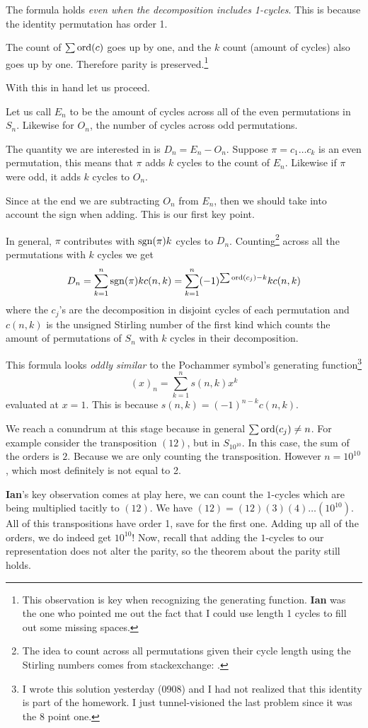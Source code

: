 \documentclass[12pt]{memoir}
\begin{document}
\begin{Rmk}
The formula holds \emph{even when the decomposition includes 1-cycles}. This is because the identity permutation has order 1.\par 
The count of $\sum\operatorname{ord}(c)$ goes up by one, and the $k$ count (amount of cycles) also goes up by one. Therefore parity is preserved.\footnote{This observation is key when recognizing the generating function. \textbf{Ian} was the one who pointed me out the fact that I could use length 1 cycles to fill out some missing spaces.}
\end{Rmk}

With this in hand let us proceed.

\begin{ptcbr}
Let us call $E_n$ to be the amount of cycles across all of the even permutations in $S_n$. Likewise for $O_n$, the number of cycles across odd permutations.\par 
The quantity we are interested in is $D_n=E_n-O_n$. Suppose $\pi=c_1\dots c_k$ is an even permutation, this means that $\pi$ adds $k$ cycles to the count of $E_n$. Likewise if $\pi$ were odd, it adds $k$ cycles to $O_n$.\par 
Since at the end we are subtracting $O_n$ from $E_n$, then we should take into account the sign when adding. This is our first key point.\par 
In general, $\pi$ contributes with $\operatorname{sgn}(\pi)k$ cycles to $D_n$. Counting\footnote{The idea to count across all permutations given their cycle length using the Stirling numbers comes from stackexchange: .} across all the permutations with $k$ cycles we get 
$$D_n=\sum_{k=1}^n\operatorname{sgn}(\pi)kc(n,k)=\sum_{k=1}^n(-1)^{\sum\operatorname{ord}(c_j)-k}kc(n,k)$$
where the $c_j$'s are the decomposition in disjoint cycles of each permutation and $c(n,k)$ is the unsigned Stirling number of the first kind which counts the amount of permutations of $S_n$ with $k$ cycles in their decomposition.\par 
This formula looks \emph{oddly similar} to the Pochammer symbol's generating function\footnote{I wrote this solution yesterday (0908) and I had not realized that this identity is part of the homework. I just tunnel-visioned the last problem since it was the 8 point one.} 
$$(x)_n=\sum_{k=1}^ns(n,k)x^k$$
evaluated at $x=1$. This is because $s(n,k)=(-1)^{n-k}c(n,k)$.
\end{ptcbr}

We reach a conundrum at this stage because in general $\sum\operatorname{ord}(c_j)\neq n$. For example consider the transposition $(12)$, but in $S_{10^{10}}$. In this case, the sum of the orders is $2$. Because we are only counting the transposition. However $n=10^{10}$, which most definitely is not equal to 2.\par 
\textbf{Ian}'s key observation comes at play here, we can count the $1$-cycles which are being multiplied tacitly to $(12)$. We have $(12)=(12)(3)(4)\dots(10^{10})$. All of this transpositions have order 1, save for the first one. Adding up all of the orders, we do indeed get $10^{10}$! Now, recall that adding the $1$-cycles to our representation does not alter the parity, so the theorem about the parity still holds. 
\end{document}
